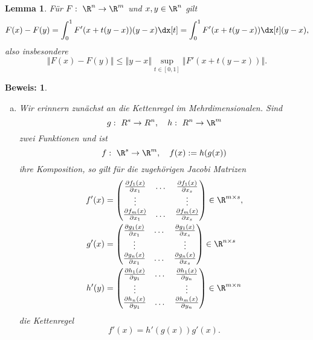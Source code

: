\documentclass[
]{mycourse}
\theoremstyle{mythm}
\newtheorem{lemma}[theorem]{Lemma}
\theoremstyle{break}
\newtheorem*{beweis}{Beweis:}
\newcommand{\norm}[1]{\left\Vert#1\right\Vert}		%
\begin{document}
\begin{appendix}
\begin{lemma}
Für $F:\ \R^n\to \R^m$ und $x,y\in \R^n$ gilt
\[
F(x)-F(y)=\int_0^1 F'(x+t(y-x))(y-x)\dx[t]=\int_0^1 F'(x+t(y-x))\dx[t](y-x),
\]
also insbesondere
\[
\norm{F(x)-F(y)}\leq \norm{y-x} \sup_{t\in [0,1]} \norm{F'(x+t(y-x))}.
\]
\end{lemma}
\begin{beweis}
\begin{enumerate}[(a)]
\item
Wir erinnern zunächst an die Kettenregel im Mehrdimensionalen. Sind 
\[
g:\ R^s\to R^n, \quad h:\ R^n\to \R^m
\]
zwei Funktionen und ist
\[
f:\ \R^s\to \R^m,\quad f(x):=h(g(x))
\]
ihre Komposition, so gilt für die zugehörigen Jacobi Matrizen
\begin{align*}
f'(x)&=
\begin{pmatrix}
\frac{\partial f_1(x)}{\partial x_1} & \dots & \frac{\partial f_1(x)}{\partial x_s}\\
\vdots & & \vdots\\
\frac{\partial f_m(x)}{\partial x_1} & \dots & \frac{\partial f_m(x)}{\partial x_s}\\
\end{pmatrix}\in \R^{m\times s},\\
g'(x)&=
\begin{pmatrix}
\frac{\partial g_1(x)}{\partial x_1} & \dots & \frac{\partial g_1(x)}{\partial x_s}\\
\vdots & & \vdots\\
\frac{\partial g_n(x)}{\partial x_1} & \dots & \frac{\partial g_n(x)}{\partial x_s}\\
\end{pmatrix}\in \R^{n\times s}\\
h'(y)&=
\begin{pmatrix}
\frac{\partial h_1(x)}{\partial y_1} & \dots & \frac{\partial h_1(x)}{\partial y_n}\\
\vdots & & \vdots\\
\frac{\partial h_n(x)}{\partial y_1} & \dots & \frac{\partial h_m(x)}{\partial y_n}\\
\end{pmatrix}\in \R^{m\times n}
\end{align*}
die Kettenregel
\[
f'(x)=h'(g(x)) g'(x).
\]


\end{enumerate}
\end{beweis}
\end{appendix}
\end{document}
